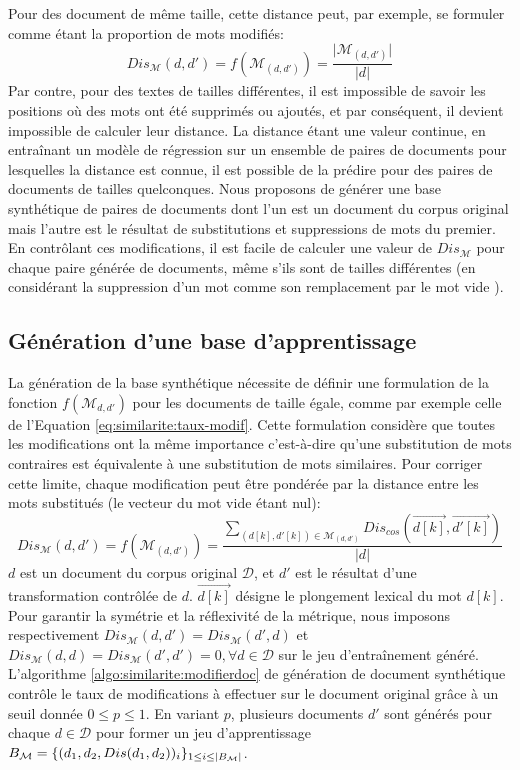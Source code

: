 Pour des document de même taille,  cette distance peut, par exemple, se formuler comme étant la proportion de mots modifiés:
\begin{equation}
{Dis_\mathcal{M}}(d,d') = {f}(\mathcal{M}_{(d,d')}) = \frac{\vert \mathcal{M}_{(d,d')} \vert}{\vert d \vert } \label{eq:similarite:taux-modif}
\end{equation}
 Par contre, pour des textes de tailles différentes, il est impossible de savoir les positions où des mots ont été supprimés ou ajoutés, et par conséquent, il devient impossible de calculer leur distance. La distance étant une valeur continue, en entraînant un modèle de régression sur un ensemble de paires de documents pour lesquelles la distance est connue, il est possible de la prédire pour des paires de documents de tailles quelconques. Nous proposons de générer une base synthétique de paires de documents dont l'un est un document du corpus original mais l'autre est le résultat de substitutions et suppressions de mots du premier. En contrôlant ces modifications, il est facile de calculer une valeur de $Dis_\mathcal{M}$ pour chaque paire générée de documents, même s'ils sont de tailles différentes (en considérant la suppression d'un mot comme son remplacement par le \og mot vide \fg{}).

\subsection{Génération d'une base d'apprentissage}
La génération de la base synthétique nécessite de définir une formulation de la fonction $f(\mathcal{M}_{d, d'})$ pour les documents de taille égale, comme par exemple celle de l'Equation \ref{eq:similarite:taux-modif}. Cette formulation considère que toutes les modifications ont la même importance c'est-à-dire qu'une substitution de mots contraires est équivalente à une substitution de mots similaires. Pour corriger cette limite, chaque modification peut être pondérée par la distance entre les mots substitués (le vecteur du  \og mot vide \fg{} étant nul):
\begin{equation}
{Dis_\mathcal{M}}(d,d') = {f}(\mathcal{M}_{(d,d')}) = \frac{\sum\limits_{(d[k], d'[k]) \in \mathcal{M}_{(d,d')}} Dis_{cos}(\overrightarrow{d[k]}, \overrightarrow{d'[k]})}{\vert d \vert} \label{eq:similarite:somme-dist-mots}
\end{equation}
$d$ est un document du corpus original $\mathcal{D}$, et $d'$ est le résultat d'une transformation contrôlée de $d$. $\overrightarrow{d[k]}$ désigne le plongement lexical du mot $d[k]$. Pour garantir la symétrie et la réflexivité de la métrique, nous imposons respectivement ${Dis_\mathcal{M}}(d,d') = {Dis_\mathcal{M}}(d', d)$ et ${Dis_\mathcal{M}}(d, d) = {Dis_\mathcal{M}}(d', d') = 0, \forall d \in \mathcal{D}$ sur le jeu d'entraînement généré. L'algorithme \ref{algo:similarite:modifierdoc} de génération de document synthétique contrôle le taux de modifications à effectuer sur le document original grâce à un seuil donnée $0\leq p\leq1$. En variant $p$, plusieurs documents $d'$ sont générés pour chaque $d \in \mathcal{D}$ pour former un jeu d'apprentissage $B_\mathcal{M} = \lbrace (d_1, d_2, {Dis}(d_1, d_2))_i\rbrace_{1 \leq i \leq {\vert B_\mathcal{M}\vert}}$.

